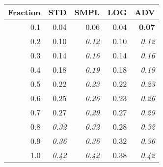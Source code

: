 \documentclass{standalone}
\begin{document}
\begin{tabular}{r|rrrr}
      \toprule
      Fraction & STD & SMPL & LOG & ADV\\
      \midrule
      0.1 & 0.04 & 0.06 & 0.04 & \textbf{0.07}\\
  0.2 & 0.10 & \emph{0.12} & 0.10 & \emph{0.12}\\
  0.3 & 0.14 & \emph{0.16} & 0.14 & \emph{0.16}\\
  0.4 & 0.18 & \emph{0.19} & 0.18 & \emph{0.19}\\
  0.5 & 0.22 & \emph{0.23} & 0.22 & \emph{0.23}\\
  0.6 & 0.25 & \emph{0.26} & 0.23 & \emph{0.26}\\
  0.7 & 0.27 & \emph{0.29} & 0.27 & \emph{0.29}\\
  0.8 & \emph{0.32} & \emph{0.32} & 0.28 & \emph{0.32}\\
  0.9 & \emph{0.36} & \emph{0.36} & 0.32 & \emph{0.36}\\
  1.0 & \emph{0.42} & \emph{0.42} & 0.38 & \emph{0.42}\\
  \bottomrule
\end{tabular}
\end{document}
